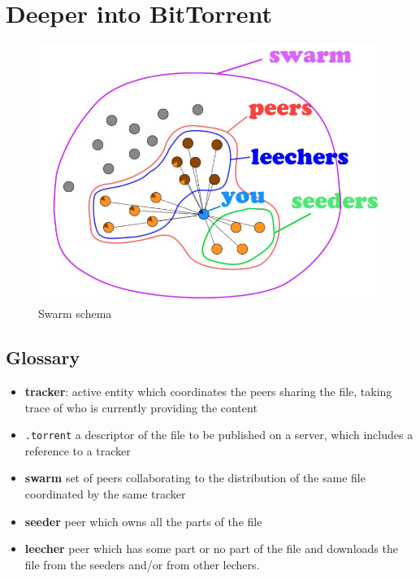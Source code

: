 \section{Deeper into BitTorrent}
\begin{figure}[htbp]
   \centering
   \includegraphics{images/bit_swarmschema.png}
   \caption{Swarm schema}
   \label{fig:bit_swarmschema}
\end{figure}
\newpage
\subsection{Glossary}
\begin{itemize}
   \item \textbf{tracker}: active entity which coordinates
   the peers sharing the file, taking trace of who is currently providing the content
   \item \texttt{.torrent} a descriptor of the file to be published on a server, which includes a reference to a tracker
   \item \textbf{swarm} set of peers collaborating to the distribution of the same file coordinated by the same tracker
   \item \textbf{seeder} peer which owns all the parts of the file
   \item \textbf{leecher} peer which has some part or no part of the file and downloads the file from the seeders and/or from other lechers.
\end{itemize}

